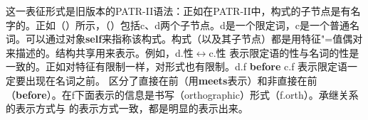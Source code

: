 \noindent
这一表征形式是旧版本的PATR-II语法\citep*{SURT83a}：正如在PATR-II中，构式的子节点是有名字的。正如（）所示，（）包括c、d两个子节点。d是一个限定词，c是一个普通名词。可以通过对象\textbf{self}来指称该构式。构式（以及其子节点）都是用特征"=值偶对来描述的。结构共享用来表示。例如，d.性$\leftrightarrow$c.性 表示限定语的性与名词的性是一致的。正如对特征有限制一样，对形式也有限制。d.f \textbf{before} c.f 表示限定语一定要出现在名词之前。\citet{BC2005a} 区分了直接在前（用\textbf{meets}表示）和非直接在前（\textbf{before}）。在f下面表示的信息是书写（orthographic）形式（f.orth）。承继关系的表示方式与 \citet{KF99a}的表示方式一致，都是明显的表示出来。

